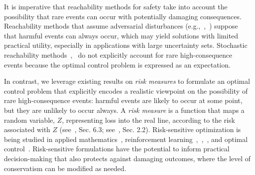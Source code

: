 \documentclass[letterpaper, 10 pt, conference]{ieeeconf}  %
\begin{document}
It is imperative that reachability methods for safety take into account the possibility that rare events can occur
with potentially damaging consequences. 
Reachability methods that assume adversarial disturbances (e.g.,~\cite{bansal2017hamilton},~\cite{bertsekas1971minimax}) suppose that harmful events can always occur,
which may yield solutions with limited practical utility, especially in applications with large uncertainty sets.
Stochastic reachability methods~\cite{abate2008probabilistic},~\cite{summers2010verification} do not explicitly account for rare high-consequence events
because the optimal control problem is expressed as an expectation. 

In contrast, we leverage existing results on \textit{risk measures} to formulate an optimal control problem
that explicitly encodes a realistic viewpoint on the possibility of rare high-consequence events: 
harmful events are likely to occur at some point, but they are unlikely to occur always.
A \textit{risk measure} is a function that maps a random variable, $Z$, representing loss into the real line,
according to the risk associated with $Z$ (see~\cite{shapiro2009lectures}, Sec. 6.3; see~\cite{kisiala2015conditional}, Sec. 2.2).
Risk-sensitive optimization
is being studied in applied mathematics~\cite{ruszczynski2010risk}, reinforcement learning~\cite{osogami2012robustness},~\cite{chow2015risk},~\cite{ratliff2017risk}, and optimal control~\cite{chow2014framework}.\footnotemark
{} 
Risk-sensitive formulations have the potential to inform practical decision-making that also protects against damaging outcomes, where the level of conservatism can be modified as needed.
\end{document}
